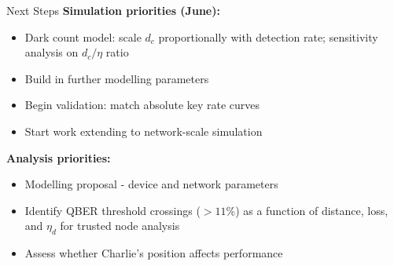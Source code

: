\documentclass[10pt]{beamer}
\begin{document}
\begin{frame}{Next Steps}
    \textbf{Simulation priorities (June):}
    \begin{itemize}
        \item Dark count model: scale $d_c$ proportionally with detection rate; sensitivity analysis on $d_c/\eta$ ratio
        \item Build in further modelling parameters
        \item Begin validation: match absolute key rate curves
        \item Start work extending to network-scale simulation
    \end{itemize}
 
    \vspace{0.15cm}
    \textbf{Analysis priorities:}
    \begin{itemize}
        \item Modelling proposal - device and network parameters
        \item Identify QBER threshold crossings ($>11\%$) as a function of distance, loss, and $\eta_d$ for trusted node analysis
        \item Assess whether Charlie's position affects performance
    \end{itemize}
\end{frame}
\end{document}
